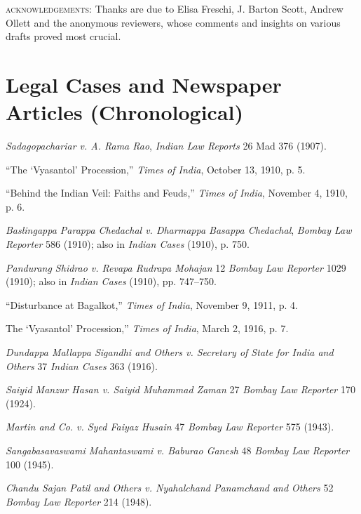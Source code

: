 \bigskip\begingroup\small
\noindent\textsc{acknowledgements:} Thanks are due to Elisa Freschi, J. Barton Scott, Andrew Ollett and the anonymous reviewers, whose comments and insights on various drafts proved most crucial.

\endgroup\bigskip
      
      
\section*{Legal Cases and Newspaper Articles (Chronological)}
\begin{hangparas}{0.125in}{1}

          
          \label{Sadagopachariar}\emph{Sadagopachariar v. A. Rama Rao}, \emph{Indian Law Reports} 26 Mad 376 (1907).\medskip


	  \label{ToI1910a}“The ‘Vyasantol’ Procession,” \emph{Times of India},  October 13, 1910, p. 5.\medskip


	  \label{ToI1910b}“Behind the Indian Veil: Faiths and Feuds,” \emph{Times of India},  November 4, 1910, p. 6.\medskip


          \label{Baslingappa}\emph{Baslingappa Parappa Chedachal v. Dharmappa Basappa Chedachal}, \emph{Bombay Law Reporter} 586 (1910); also in \emph{Indian Cases} (1910), p. 750.\medskip


          \label{Pandurang}\emph{Pandurang Shidrao v. Revapa Rudrapa Mohajan} 12 \emph{Bombay Law Reporter} 1029 (1910); also in \emph{Indian Cases} (1910), pp. 747–750.\medskip


	  \label{ToI1911}“Disturbance at Bagalkot,” \emph{Times of India}, November 9, 1911, p. 4.\medskip


	  \label{ToI1916}The ‘Vyasantol’ Procession,” \emph{Times of India},  March 2, 1916, p. 7.\medskip


          \label{Dundappa}\emph{Dundappa Mallappa Sigandhi and Others v. Secretary of State for India and Others} 37 \emph{Indian Cases} 363 (1916).\medskip


          \label{Saiyid}\emph{Saiyid Manzur Hasan v. Saiyid Muhammad Zaman} 27 \emph{Bombay Law Reporter} 170 (1924).\medskip


          \label{Martin}\emph{Martin and Co. v. Syed Faiyaz Husain} 47 \emph{Bombay Law Reporter} 575 (1943).\medskip


          \label{Sangabasavaswami}\emph{Sangabasavaswami Mahantaswami v. Baburao Ganesh} 48 \emph{Bombay Law Reporter} 100 (1945).\medskip


          \label{Chandu}\emph{Chandu Sajan Patil and Others v. Nyahalchand Panamchand and Others} 52 \emph{Bombay Law Reporter} 214 (1948).\medskip


	
\end{hangparas}

